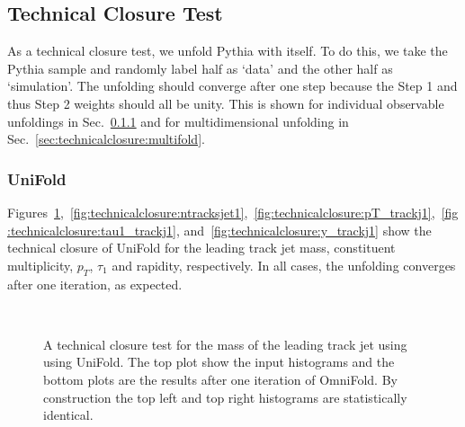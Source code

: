 \documentclass[NOTE, atlasdraft=true, texlive=2016, UKenglish]{\ATLASLATEXPATH atlasdoc}
\begin{document}
\subsection{Technical Closure Test}
\label{sec:technicalclosure}

As a technical closure test, we unfold Pythia with itself.  To do this, we take the Pythia sample and randomly label half as `data' and the other half as `simulation'.   The unfolding should converge after one step because the Step 1 and thus Step 2 weights should all be unity.  This is shown for individual observable unfoldings in Sec.~\ref{sec:technicalclosure:unifold} and for multidimensional unfolding in Sec.~\ref{sec:technicalclosure:multifold}.

\subsubsection{UniFold}
\label{sec:technicalclosure:unifold}

Figures~\ref{fig:technicalclosure:mass},~\ref{fig:technicalclosure:ntracksjet1},~\ref{fig:technicalclosure:pT_trackj1},~\ref{fig:technicalclosure:tau1_trackj1}, and~\ref{fig:technicalclosure:y_trackj1} show the technical closure of UniFold for the leading track jet mass, constituent multiplicity, $p_T$, $\tau_1$ and rapidity, respectively.  In all cases, the unfolding converges after one iteration, as expected.

\begin{figure}[h!]
\centering
{}\\
\caption{A technical closure test for the mass of the leading track jet using using UniFold.  The top plot show the input histograms and the bottom plots are the results after one iteration of OmniFold.  By construction the top left and top right histograms are statistically identical.}
\label{fig:technicalclosure:mass}
\end{figure}
\end{document}
